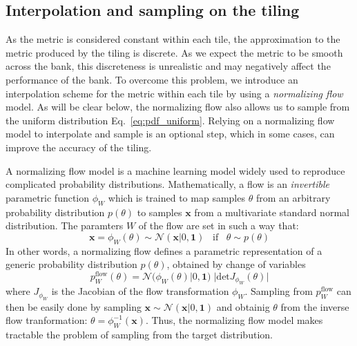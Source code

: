 \documentclass[twocolumn,showpacs,preprintnumbers,nofootinbib,prd,
superscriptaddress,10pt]{revtex4-2}
\begin{document}
\subsection{Interpolation and sampling on the tiling} \label{sec:normalizing_flow}

As the metric is considered constant within each tile, the approximation to the metric produced by the tiling is discrete. As we expect the metric 
 to be smooth across the bank, this discreteness is unrealistic and may negatively affect the performance of the bank. To overcome this problem, we introduce an interpolation scheme for the metric within each tile by using a {\it normalizing flow} model. As will be clear below, the normalizing flow also allows us to sample from the uniform distribution Eq.~\eqref{eq:pdf_uniform}.
Relying on a normalizing flow model to interpolate and sample is an optional step, which in some cases, can improve the accuracy of the tiling. 

A normalizing flow model \cite{norm_flow, nflows_paper, Kobyzev_2021, Papamakarios_thesis} is a machine learning model widely used to reproduce complicated probability distributions.
Mathematically, a flow is an {\it invertible} parametric function $\phi_W$ which is trained to map samples $\theta$ from an arbitrary probability distribution $p(\theta)$ to samples $\mathbf{x}$ from a multivariate standard normal distribution.
The paramters $W$ of the flow are set in such a way that:
\begin{equation}
	\mathbf{x} = \phi_W(\theta) \sim \mathcal{N}(\mathbf{x}|0,\mathbf{1}) \;\;\; \text{if} \;\;\;  \theta \sim p(\theta)
\end{equation}
%
In other words, a normalizing flow defines a parametric representation of a generic probability distribution $p(\theta)$, obtained by change of variables
\begin{equation}\label{eq:p_flow}
	p^\text{flow}_W(\theta) = \mathcal{N}(\phi_W(\theta)|0,\mathbf{1}) \; |\text{det} J_{\phi_W}(\theta)|
\end{equation}
where $J_{\phi_W}$ is the Jacobian of the flow transformation $\phi_W$.
Sampling from $p^\text{flow}_W$ can then be easily done by sampling $\mathbf{x} \sim \mathcal{N}(\mathbf{x}|0,\mathbf{1})$ and obtainig $\theta$ from the inverse flow tranformation: $\theta = \phi_W^{-1}(\mathbf{x})$.
Thus, the normalizing flow model makes tractable the problem of sampling from the target distribution.
\end{document}
